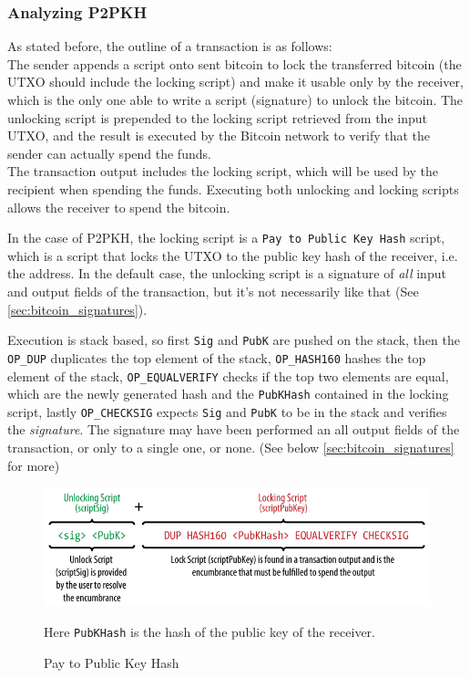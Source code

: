 \subsubsection{Analyzing P2PKH}
As stated before, the outline of a transaction is as follows:\\
The sender appends a script onto sent bitcoin to lock the transferred bitcoin (the UTXO should include the locking script) and make it usable only by the receiver, which is the only one able to write a script (signature) to unlock the bitcoin.
The unlocking script is prepended to the locking script retrieved from the input UTXO, and the result is executed by the Bitcoin network to verify that the sender can actually spend the funds.\\
The transaction output includes the locking script, which will be used by the recipient when spending the funds.
Executing both unlocking and locking scripts allows the receiver to spend the bitcoin.

In the case of P2PKH, the locking script is a \texttt{Pay to Public Key Hash} script, which is a script that locks the UTXO to the public key hash of the receiver, i.e. the address.
In the default case, the unlocking script is a signature of \textit{all} input and output fields of the transaction, but it's not necessarily like that (See \ref{sec:bitcoin_signatures}).
\begin{paracol}{2}

   Execution is stack based, so first \texttt{Sig} and \texttt{PubK} are pushed on the stack, then the \texttt{OP\_DUP} duplicates the top element of the stack, \texttt{OP\_HASH160} hashes the top element of the stack, \texttt{OP\_EQUALVERIFY} checks if the top two elements are equal, which are the newly generated hash and the \texttt{PubKHash} contained in the locking script,
   lastly \texttt{OP\_CHECKSIG} expects \texttt{Sig} and \texttt{PubK} to be in the stack and verifies the \textit{signature}.
   The signature may have been performed an all output fields of the transaction, or only to a single one, or none. (See below \ref{sec:bitcoin_signatures} for more)
   
   \switchcolumn
   \colfill
   \begin{figure}[htbp]
      \centering
      \includegraphics[width=0.95\columnwidth]{images/bitcoin_p2pkh.png}
      \caption{Pay to Public Key Hash}
      Here \texttt{PubKHash} is the hash of the public key of the receiver.
      \label{fig:bitcoin_p2pkh}
   \end{figure}
   \colfill
   
\end{paracol}

